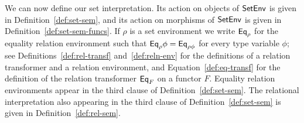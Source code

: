 \documentclass{lmcs}
\theoremstyle{plain}\newtheorem{satz}[thm]{Satz}
\begin{document}
{We can now define our set interpretation. Its action on objects of
$\mathsf{SetEnv}$ is given in Definition~\ref{def:set-sem}, and its action on
morphisms of $\mathsf{SetEnv}$ is given in Definition~\ref{def:set-sem-funcs}.
If $\rho$ is a set environment we write $\mathsf{Eq}_\rho$ for the equality
relation environment such that $\mathsf{Eq}_\rho \phi = \mathsf{Eq}_{\rho \phi}$ for
every type variable $\phi$; see Definitions~\ref{def:rel-transf}
and~\ref{def:reln-env} for the definitions of a relation transformer
and a relation environment, and Equation~\ref{def:eq-transf} for the
definition of the relation transformer $\mathsf{Eq}_F$ on a functor $F$.
Equality relation environments appear in the third clause of
Definition~\ref{def:set-sem}.  The relational interpretation also
appearing in the third clause of Definition~\ref{def:set-sem} is
given in Definition~\ref{def:rel-sem}.

}
\end{document}
